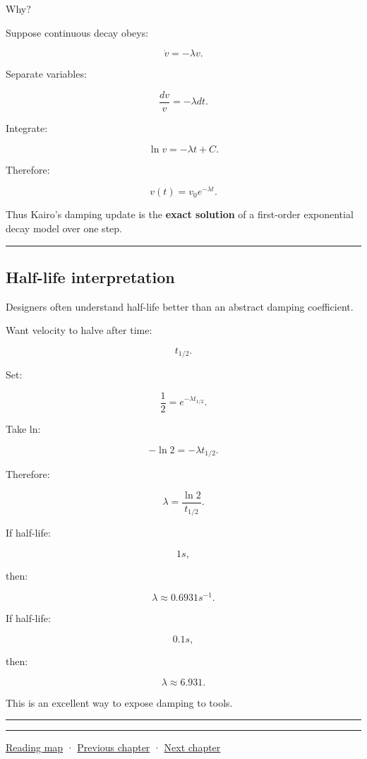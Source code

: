 Why?

Suppose continuous decay obeys:

\[
\dot v=-\lambda v.
\]

Separate variables:

\[
\frac{dv}{v}
=
-\lambda dt.
\]

Integrate:

\[
\ln v
=
-\lambda t+C.
\]

Therefore:

\[
v(t)=v_0e^{-\lambda t}.
\]

Thus Kairo's damping update is the \textbf{exact solution} of a first-order exponential decay model over one step.

\begin{center}\rule{0.5\linewidth}{0.5pt}\end{center}

\subsection{Half-life interpretation}\label{06-engine-ii-ch038-half-life-interpretation}

Designers often understand half-life better than an abstract damping coefficient.

Want velocity to halve after time:

\[
t_{1/2}.
\]

Set:

\[
\frac12
=
e^{-\lambda t_{1/2}}.
\]

Take ln:

\[
-\ln2
=
-\lambda t_{1/2}.
\]

Therefore:

\[
\boxed{
\lambda
=
\frac{\ln2}{t_{1/2}}.
}
\]

If half-life:

\[
1s,
\]

then:

\[
\lambda\approx0.6931s^{-1}.
\]

If half-life:

\[
0.1s,
\]

then:

\[
\lambda\approx6.931.
\]

This is an excellent way to expose damping to tools.

\begin{center}\rule{0.5\linewidth}{0.5pt}\end{center}

\begin{center}\rule{0.5\linewidth}{0.5pt}\end{center}

\hyperref[volume-reading-map]{Reading map} · \hyperref[06-engine-ii-ch037-physical-examples-and-state-validation]{Previous chapter} · \hyperref[06-engine-ii-ch039-composable-timesteps-and-stable-simulation-policy]{Next chapter}
